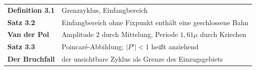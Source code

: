 \begin{merksatz}
\begin{center}
\renewcommand{\arraystretch}{1.5}
\begin{tabular}{@{}P{3.0cm}P{5.6cm}@{}}
\toprule
\textbf{Definition 3.1} & Grenzzyklus, Einfangbereich\\
\textbf{Satz 3.2} & Einfangbereich ohne Fixpunkt enthält eine geschlossene Bahn\\
\textbf{Van der Pol} & Amplitude $2$ durch Mittelung, Periode $1{,}61\mu$ durch Kriechen\\
\textbf{Satz 3.3} & Poincaré-Abbildung; $|P'| < 1$ heißt anziehend\\
\textbf{Der Bruchfall} & der unsichtbare Zyklus als Grenze des Einzugsgebiets\\
\bottomrule
\end{tabular}
\end{center}

\begin{center}
\begin{minipage}{0.88\textwidth}
\end{minipage}
\end{center}
\end{merksatz}
